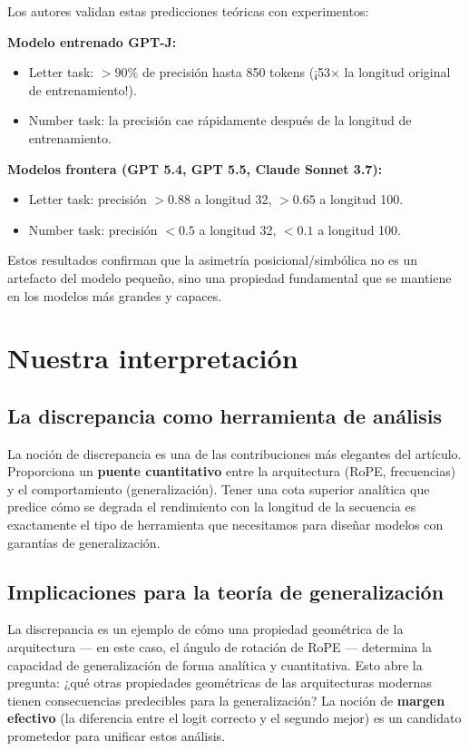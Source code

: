 \documentclass[12pt,a4paper,oneside]{report}
\begin{document}
Los autores validan estas predicciones teóricas con experimentos:

\textbf{Modelo entrenado GPT-J:}
\begin{itemize}
    \item Letter task: $>90\%$ de precisión hasta 850 tokens (¡53× la longitud original de entrenamiento!).
    \item Number task: la precisión cae rápidamente después de la longitud de entrenamiento.
\end{itemize}

\textbf{Modelos frontera (GPT 5.4, GPT 5.5, Claude Sonnet 3.7):}
\begin{itemize}
    \item Letter task: precisión $>0.88$ a longitud 32, $>0.65$ a longitud 100.
    \item Number task: precisión $<0.5$ a longitud 32, $<0.1$ a longitud 100.
\end{itemize}

Estos resultados confirman que la asimetría posicional/simbólica no es un artefacto del modelo pequeño, sino una propiedad fundamental que se mantiene en los modelos más grandes y capaces.

\section{Nuestra interpretación}

\subsection{La discrepancia como herramienta de análisis}

La noción de discrepancia es una de las contribuciones más elegantes del artículo. Proporciona un \textbf{puente cuantitativo} entre la arquitectura (RoPE, frecuencias) y el comportamiento (generalización). Tener una cota superior analítica que predice cómo se degrada el rendimiento con la longitud de la secuencia es exactamente el tipo de herramienta que necesitamos para diseñar modelos con garantías de generalización.

\subsection{Implicaciones para la teoría de generalización}

La discrepancia es un ejemplo de cómo una propiedad geométrica de la arquitectura — en este caso, el ángulo de rotación de RoPE — determina la capacidad de generalización de forma analítica y cuantitativa. Esto abre la pregunta: ¿qué otras propiedades geométricas de las arquitecturas modernas tienen consecuencias predecibles para la generalización? La noción de \textbf{margen efectivo} (la diferencia entre el logit correcto y el segundo mejor) es un candidato prometedor para unificar estos análisis.
\end{document}
